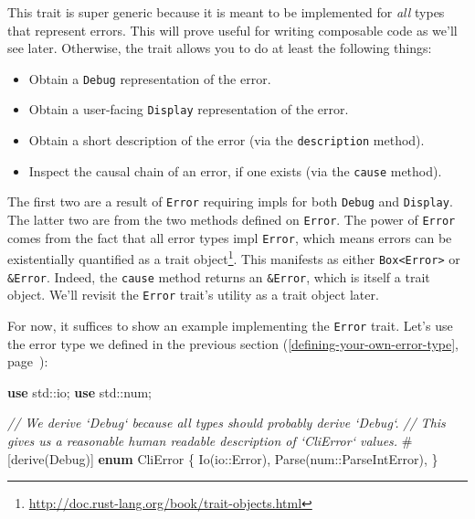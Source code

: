 \documentclass[a4paper,]{book}
\renewcommand*{\hyperref}[2][\ar]{%
  \def\ar{#2}%
  #2 (\autoref{#1}, page~\pageref{#1})}
\newenvironment{Shaded}{\begin{snugshade}}{\end{snugshade}}
\newcommand{\KeywordTok}[1]{\textcolor[rgb]{0.13,0.29,0.53}{\textbf{{#1}}}}
\newcommand{\CommentTok}[1]{\textcolor[rgb]{0.56,0.35,0.01}{\textit{{#1}}}}
\newcommand{\BuiltInTok}[1]{{#1}}
\newcommand{\AttributeTok}[1]{\textcolor[rgb]{0.77,0.63,0.00}{{#1}}}
\newcommand{\NormalTok}[1]{{#1}}
\renewcommand{\href}[2]{#2\footnote{\url{#1}}}
\providecommand{\tightlist}{%
  \setlength{\itemsep}{0pt}\setlength{\parskip}{0pt}}
\begin{document}
This trait is super generic because it is meant to be implemented for
\emph{all} types that represent errors. This will prove useful for
writing composable code as we'll see later. Otherwise, the trait allows
you to do at least the following things:

\begin{itemize}
\tightlist
\item
  Obtain a \texttt{Debug} representation of the error.
\item
  Obtain a user-facing \texttt{Display} representation of the error.
\item
  Obtain a short description of the error (via the \texttt{description}
  method).
\item
  Inspect the causal chain of an error, if one exists (via the
  \texttt{cause} method).
\end{itemize}

The first two are a result of \texttt{Error} requiring impls for both
\texttt{Debug} and \texttt{Display}. The latter two are from the two
methods defined on \texttt{Error}. The power of \texttt{Error} comes
from the fact that all error types impl \texttt{Error}, which means
errors can be existentially quantified as a
\href{http://doc.rust-lang.org/book/trait-objects.html}{trait object}.
This manifests as either \texttt{Box\textless{}Error\textgreater{}} or
\texttt{\&Error}. Indeed, the \texttt{cause} method returns an
\texttt{\&Error}, which is itself a trait object. We'll revisit the
\texttt{Error} trait's utility as a trait object later.

For now, it suffices to show an example implementing the \texttt{Error}
trait. Let's use the error type we defined in the
\hyperref[defining-your-own-error-type]{previous section}:

\begin{Shaded}
\begin{Highlighting}[]
\KeywordTok{use} \NormalTok{std::io;}
\KeywordTok{use} \NormalTok{std::num;}

\CommentTok{// We derive `Debug` because all types should probably derive `Debug`.}
\CommentTok{// This gives us a reasonable human readable description of `CliError` values.}
\AttributeTok{#[}\NormalTok{derive}\AttributeTok{(}\BuiltInTok{Debug}\AttributeTok{)]}
\KeywordTok{enum} \NormalTok{CliError \{}
    \NormalTok{Io(io::Error),}
    \NormalTok{Parse(num::ParseIntError),}
\NormalTok{\}}
\end{Highlighting}
\end{Shaded}
\end{document}
